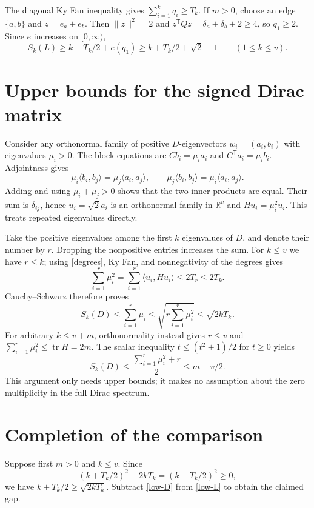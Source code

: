 \documentclass[11pt]{article}
\newcommand{\tr}{\operatorname{tr}}
\newcommand{\Sk}[2]{S_{#1}(#2)}
\begin{document}
The diagonal Ky Fan inequality gives
$\sum_{i=1}^kq_i\ge T_k$.
If $m>0$, choose an edge $\{a,b\}$ and $z=e_a+e_b$. Then
$\|z\|^2=2$ and $z^{\mathsf T}Qz=\delta_a+\delta_b+2\ge4$,
so $q_1\ge2$. Since $e$ increases on $[0,\infty)$,
\begin{equation}\label{low-L}
 \Sk{k}{L}\ge k+T_k/2+e(q_1)
 \ge k+T_k/2+\sqrt2-1\qquad(1\le k\le v).
\end{equation}

\section{Upper bounds for the signed Dirac matrix}
Consider any orthonormal family of positive $D$-eigenvectors
$w_i=(a_i,b_i)$ with eigenvalues $\mu_i>0$.
The block equations are
$Cb_i=\mu_i a_i$ and $C^{\mathsf T}a_i=\mu_i b_i$.
Adjointness gives
\[
 \mu_i\langle b_i,b_j\rangle=\mu_j\langle a_i,a_j\rangle,
 \qquad
 \mu_j\langle b_i,b_j\rangle=\mu_i\langle a_i,a_j\rangle.
\]
Adding and using $\mu_i+\mu_j>0$ shows that the two inner products
are equal. Their sum is $\delta_{ij}$, hence
$u_i=\sqrt2a_i$ is an orthonormal family in $\mathbb R^v$ and
$Hu_i=\mu_i^2u_i$. This treats repeated eigenvalues directly.

Take the positive eigenvalues among the first $k$ eigenvalues of $D$,
and denote their number by $r$. Dropping the nonpositive entries increases
the sum. For $k\le v$ we have $r\le k$; using \eqref{degrees}, Ky Fan,
and nonnegativity of the degrees gives
\[
 \sum_{i=1}^r\mu_i^2
 =\sum_{i=1}^r\langle u_i,Hu_i\rangle
 \le2T_r\le2T_k.
\]
Cauchy--Schwarz therefore proves
\begin{equation}\label{low-D}
 \Sk{k}{D}\le\sum_{i=1}^r\mu_i
 \le\sqrt{r\sum_{i=1}^r\mu_i^2}\le\sqrt{2kT_k}.
\end{equation}
For arbitrary $k\le v+m$, orthonormality instead gives $r\le v$ and
$\sum_{i=1}^r\mu_i^2\le\tr H=2m$. The scalar inequality
$t\le(t^2+1)/2$ for $t\ge0$ yields
\begin{equation}\label{global-D}
 \Sk{k}{D}\le\frac{\sum_{i=1}^r\mu_i^2+r}{2}\le m+v/2.
\end{equation}
This argument only needs upper bounds; it makes no assumption about
the zero multiplicity in the full Dirac spectrum.

\section{Completion of the comparison}
Suppose first $m>0$ and $k\le v$. Since
\[
 (k+T_k/2)^2-2kT_k=(k-T_k/2)^2\ge0,
\]
we have $k+T_k/2\ge\sqrt{2kT_k}$. Subtract
\eqref{low-D} from \eqref{low-L} to obtain the claimed gap.
\end{document}
